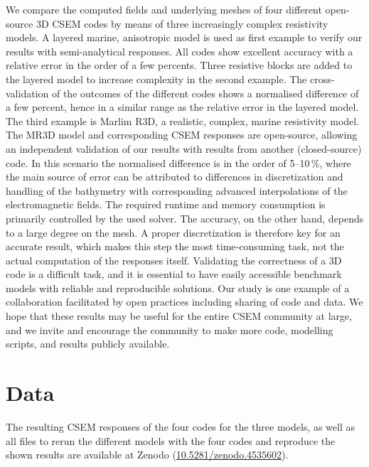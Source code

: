 \documentclass[a4paper, extra, camera,%
]{gji}
\begin{document}
We compare the computed fields and underlying meshes of four different open-source 3D CSEM codes by means of three increasingly complex resistivity models. A layered marine, anisotropic model is used as first example to verify our results with semi-analytical responses. All codes show excellent accuracy with a relative error in the order of a few percents. Three resistive blocks are added to the layered model to increase complexity in the second example. The cross-validation of the outcomes of the different codes shows a normalised difference of a few percent, hence in a similar range as the relative error in the layered model. The third example is Marlim R3D, a realistic, complex, marine resistivity model. The MR3D model and corresponding CSEM responses are open-source, allowing an independent validation of our results with results from another (closed-source) code. In this scenario the normalised difference is in the order of 5--10\,\%, where the main source of error can be attributed to differences in discretization and handling of the bathymetry with corresponding advanced interpolations of the electromagnetic fields. The required runtime and memory consumption is primarily controlled by the used solver. The accuracy, on the other hand, depends to a large degree on the mesh. A proper discretization is therefore key for an accurate result, which makes this step the most time-consuming task, not the actual computation of the responses itself. Validating the correctness of a 3D code is a difficult task, and it is essential to have easily accessible benchmark models with reliable and reproducible solutions. Our study is one example of a collaboration facilitated by open practices including sharing of code and data. We hope that these results may be useful for the entire CSEM community at large, and we invite and encourage the community to make more code, modelling scripts, and results publicly available.


\section{Data}
The resulting CSEM responses of the four codes for the three models, as well as all files to rerun the different models with the four codes and reproduce the shown results are available at Zenodo (\href{https://doi.org/10.5281/zenodo.4535602}{10.5281/zenodo.4535602}).
\end{document}
